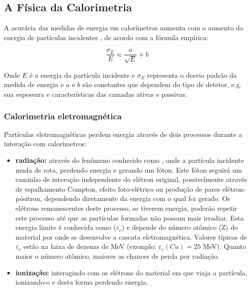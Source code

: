 \subsection{A Física da Calorimetria}

A acurácia das medidas de energia em calorímetros aumenta com o aumento da
energia de partículas incidentes \cite{hadcal}, de acordo com a fórmula
empírica:

\begin{equation}
  \frac{\sigma_{E}}{E} \approx \frac{a}{\sqrt{E}} + b
\end{equation}

Onde $E$ é a energia da partícula incidente e $\sigma_{E}$ representa o desvio
padrão da medida de energia e $a$ e $b$ são constantes que dependem do tipo de
detetor, e.g. sua espessura e características das camadas ativas e passivas.

\subsubsection{Calorimetria eletromagnética}

Partículas eletromagnéticas perdem energia através de dois processos durante a
interação com calorímetros:

\begin{itemize}
\item {\bf radiação:} através do fenômeno conhecido como
  , onde a partícula incidente muda de rota, perdendo
  energia e gerando um fóton. Este fóton seguirá um caminho de interação
  independente do elétron original, possivelmente através de espalhamento
  Compton, efeito foto-elétrico ou produção de pares elétron-pósitron,
  dependendo diretamente da energia com o qual foi gerado. Os elétrons
  remanescentes deste processo, se tiverem energia, poderão repetir este
  processo até que as partículas formadas não possam mais irradiar. Esta
  energia limite é conhecida como  ($\varepsilon_{c}$) e
  depende do número atômico (Z) do material por onde se desenvolve a cascata
  eletromagnética. Valores típicos de $\varepsilon_{c}$ estão na faixa de
  dezenas de MeV (exemplo: $\varepsilon_{c}(Cu) = 25$ MeV). Quanto maior o
  número atômico, maiores as chances de perda por radiação\cite{knoll, leo}.

\item {\bf ionização:} interagindo com os elétrons do material em que viaja a
  partícula, ionizando-o e desta forma perdendo energia.
\end{itemize}

